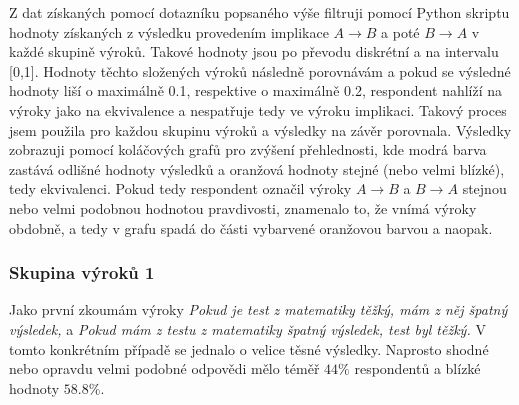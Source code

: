 Z dat získaných pomocí dotazníku popsaného výše filtruji pomocí Python skriptu hodnoty získaných z výsledku provedením implikace $A \to B$ a poté $B \to A$ v každé skupině výrok\r u. Takové hodnoty jsou po převodu diskrétní a na intervalu [0,1]. Hodnoty těchto složených výrok\r u následně porovnávám a pokud se výsledné hodnoty liší o maxim\' aln\v e 0.1, respektive o maxim\' aln\v e 0.2, respondent nahlíží na výroky jako na ekvivalence a nespatřuje tedy ve výroku implikaci. Takový proces jsem použila pro každou skupinu výrok\r u a výsledky na závěr porovnala. Výsledky zobrazuji pomocí koláčových graf\r u pro zvýšení přehlednosti, kde modrá barva zastává odlišné hodnoty výsledk\r u a oranžová hodnoty stejné (nebo velmi blízké), tedy ekvivalenci. Pokud tedy respondent označil výroky $A \to B$ a $B \to A$ stejnou nebo velmi podobnou hodnotou pravdivosti, znamenalo to, že vnímá výroky obdobně, a tedy v grafu spadá do části vybarvené oranžovou barvou a naopak.

\subsubsection{Skupina výrok\r u 1}
Jako první zkoumám výroky \textit{\clqq Pokud je test z matematiky těžký, mám z něj špatný výsledek,\crqq } \space a \textit{\clqq Pokud mám z testu z matematiky špatný výsledek, test byl těžký.\crqq } \space V tomto konkrétním případě se jednalo o velice těsné výsledky. Naprosto shodné nebo opravdu velmi podobné odpovědi mělo téměř $44 $\space$ \%$ respondent\r u a blízké hodnoty $58.8 $\space$ \%.$

